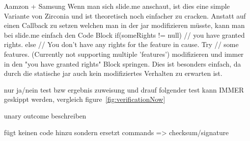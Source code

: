 Aamzon + Samsung
Wenn man sich slide.me anschaut, ist dies eine simple Variante von Zirconia und ist theoretisch noch einfacher zu cracken. Anstatt auf einen Callback zu setzen welchen man in der jar modifizieren müsste, kann man bei slide.me einfach den Code Block
 if(someRights != null){
        // you have granted rights.
    } else {
        // You don't have any rights for the feature in cause. Try
        // some features. (Currently not supporting multiple 'features')
    }
modifizieren und immer in den "you have granted rights" Block springen. Dies ist besonders einfach, da durch die statische jar auch kein modifiziertes Verhalten zu erwarten ist.


nur ja/nein test bzw ergebnis zuweisung und drauf folgender test kann IMMER geskippt werden, vergleich figure~\ref{fig:verificationNow}

unary outcome beschreiben

fügt keinen code hinzu sondern ersetzt commands => checksum/signature
